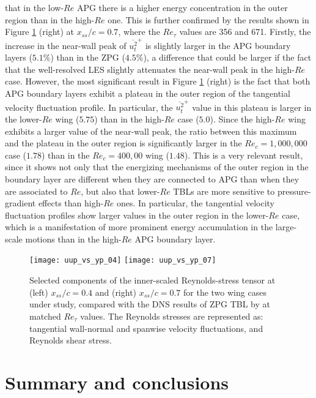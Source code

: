 that in the low-$Re$ APG there is a higher energy concentration in the outer region than in the high-$Re$ one. This is further confirmed by the results shown in Figure \ref{uup_vs_yp} (right) at $x_{ss}/c=0.7$, where the $Re_{\tau}$ values are 356 and 671. Firstly, the increase in the near-wall peak of $\overline{u^{2}_{t}}^{+}$ is slightly larger in the APG boundary layers ($5.1\%$) than in the ZPG ($4.5\%$), a difference that could be larger if the fact that the well-resolved LES slightly attenuates the near-wall peak in the high-$Re$ case. However, the most significant result in Figure \ref{uup_vs_yp} (right) is the fact that both APG boundary layers exhibit a plateau in the outer region of the tangential velocity fluctuation profile. In particular, the $\overline{u^{2}_{t}}^{+}$ value in this plateau is larger in the lower-$Re$ wing ($5.75$) than in the high-$Re$ case ($5.0$). Since the high-$Re$ wing exhibits a larger value of the near-wall peak, the ratio between this maximum and the plateau in the outer region is significantly larger in the $Re_{c}=1,000,000$ case ($1.78$) than in the $Re_{c}=400,00$ wing ($1.48$). This is a very relevant result, since it shows not only that the energizing mechanisms of the outer region in the boundary layer are different when they are connected to APG than when they are associated to $Re$, but also that lower-$Re$ TBLs are more sensitive to pressure-gradient effects than high-$Re$ ones. In particular, the tangential velocity fluctuation profiles show larger values in the outer region in the lower-$Re$ case, which is a manifestation of more prominent energy accumulation in the large-scale motions than in the high-$Re$ APG boundary layer.
\begin{figure}[t]
\centering
\texttt{[image: uup\_vs\_yp\_04]}
\texttt{[image: uup\_vs\_yp\_07]}
\caption{Selected components of the inner-scaled Reynolds-stress tensor at (left) $x_{ss}/c=0.4$ and (right) $x_{ss}/c=0.7$ for the two wing cases under study, compared with the DNS results of ZPG TBL by \cite{schlatter10} at matched $Re_{\tau}$ values. The Reynolds stresses are represented as: {\color{blue}\solid} tangential {\color{red}\solid} wall-normal and {\color{green}\solid} spanwise velocity fluctuations, and {\color{cyan}\solid} Reynolds shear stress.}
\label{uup_vs_yp}
\end{figure}

\section{Summary and conclusions}

